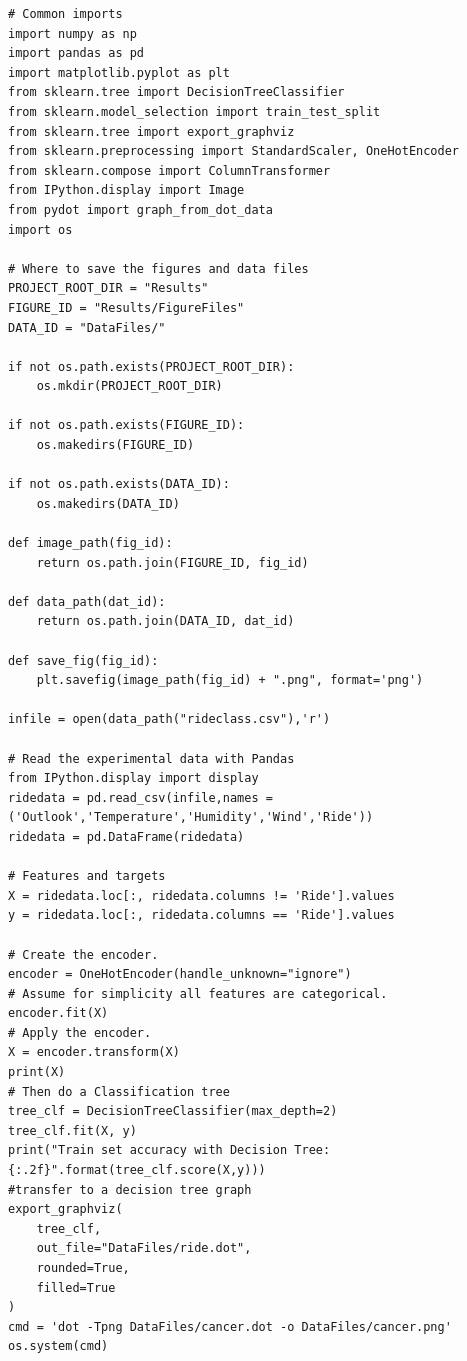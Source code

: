 \documentclass[%
oneside,                 %
final,                   %
10pt]{article}
\begin{document}
\begin{verbatim}
# Common imports
import numpy as np
import pandas as pd
import matplotlib.pyplot as plt
from sklearn.tree import DecisionTreeClassifier
from sklearn.model_selection import train_test_split
from sklearn.tree import export_graphviz
from sklearn.preprocessing import StandardScaler, OneHotEncoder
from sklearn.compose import ColumnTransformer
from IPython.display import Image 
from pydot import graph_from_dot_data
import os

# Where to save the figures and data files
PROJECT_ROOT_DIR = "Results"
FIGURE_ID = "Results/FigureFiles"
DATA_ID = "DataFiles/"

if not os.path.exists(PROJECT_ROOT_DIR):
    os.mkdir(PROJECT_ROOT_DIR)

if not os.path.exists(FIGURE_ID):
    os.makedirs(FIGURE_ID)

if not os.path.exists(DATA_ID):
    os.makedirs(DATA_ID)

def image_path(fig_id):
    return os.path.join(FIGURE_ID, fig_id)

def data_path(dat_id):
    return os.path.join(DATA_ID, dat_id)

def save_fig(fig_id):
    plt.savefig(image_path(fig_id) + ".png", format='png')

infile = open(data_path("rideclass.csv"),'r')

# Read the experimental data with Pandas
from IPython.display import display
ridedata = pd.read_csv(infile,names = ('Outlook','Temperature','Humidity','Wind','Ride'))
ridedata = pd.DataFrame(ridedata)

# Features and targets
X = ridedata.loc[:, ridedata.columns != 'Ride'].values
y = ridedata.loc[:, ridedata.columns == 'Ride'].values

# Create the encoder.
encoder = OneHotEncoder(handle_unknown="ignore")
# Assume for simplicity all features are categorical.
encoder.fit(X)    
# Apply the encoder.
X = encoder.transform(X)
print(X)
# Then do a Classification tree
tree_clf = DecisionTreeClassifier(max_depth=2)
tree_clf.fit(X, y)
print("Train set accuracy with Decision Tree: {:.2f}".format(tree_clf.score(X,y)))
#transfer to a decision tree graph
export_graphviz(
    tree_clf,
    out_file="DataFiles/ride.dot",
    rounded=True,
    filled=True
)
cmd = 'dot -Tpng DataFiles/cancer.dot -o DataFiles/cancer.png'
os.system(cmd)


\end{verbatim}
\end{document}
